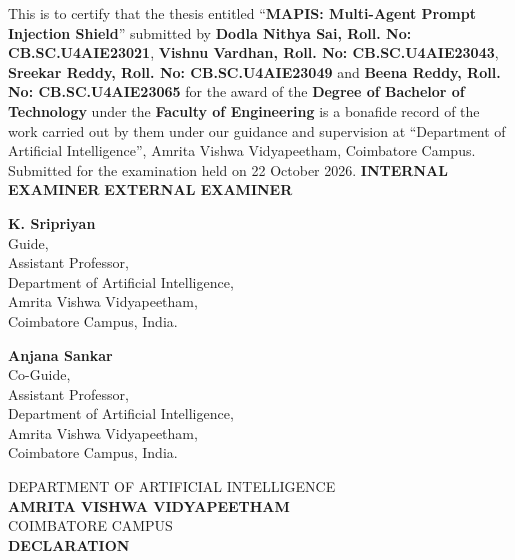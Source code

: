 \documentclass[a4paper, 12pt]{report}
\theoremstyle{definition}
\begin{document}
	\vspace*{.8cm}
	\noindent This is to certify that the thesis entitled \enquote{\textbf{MAPIS: Multi-Agent Prompt Injection Shield}} submitted by \textbf{Dodla Nithya Sai, Roll. No: CB.SC.U4AIE23021}, \textbf{Vishnu Vardhan, Roll. No: CB.SC.U4AIE23043}, \textbf{Sreekar Reddy, Roll. No: CB.SC.U4AIE23049} and \textbf{Beena Reddy, Roll. No: CB.SC.U4AIE23065} for the award of the \textbf{Degree of Bachelor of Technology} under the \textbf{Faculty of Engineering} is a bonafide record of the work carried out by them under our guidance and supervision at \enquote{Department of Artificial Intelligence}, Amrita Vishwa Vidyapeetham, Coimbatore Campus.\\
    \vfill
    Submitted for the examination held on 22 October 2026.
    \vfill
    \textbf{INTERNAL EXAMINER}    \hspace{5cm}      \textbf{EXTERNAL EXAMINER}
    \vfill
\noindent\begin{minipage}[t]{0.48\textwidth}\centering
	\textbf{K. Sripriyan}\\
	Guide,\\
	Assistant Professor,\\
	Department of Artificial Intelligence,\\
	Amrita Vishwa Vidyapeetham,\\
	Coimbatore Campus, India.
\end{minipage}\hfill
\begin{minipage}[t]{0.48\textwidth}\centering
	\textbf{Anjana Sankar}\\
	Co-Guide,\\
	Assistant Professor,\\
	Department of Artificial Intelligence,\\
	Amrita Vishwa Vidyapeetham,\\
	Coimbatore Campus, India.
\end{minipage}

	\newpage
	\begin{center}
	{\large DEPARTMENT OF ARTIFICIAL INTELLIGENCE}\\
	\Large{ \textbf{AMRITA VISHWA VIDYAPEETHAM}}\\

	{\large COIMBATORE CAMPUS}\\
		
	
		\vspace*{2.5cm}
		\large {\textbf{DECLARATION}}
		\vspace*{.3cm}
	\end{center}
	
\end{document}
